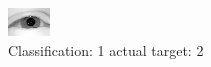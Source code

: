 \begin{figure}[h!]
\begin{center}
\includegraphics[width=0.60\columnwidth]{figures/ID2372_class_1_target_2.png}
\end{center}
\caption{ Classification: 1 actual target: 2}
\label{fig:ID2372_class_1_target_2}
\end{figure}
